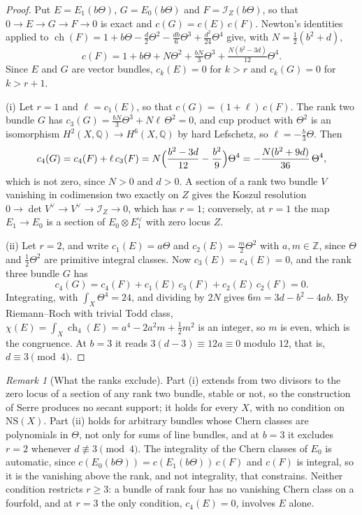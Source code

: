 \documentclass[11pt,reqno]{amsart}
\theoremstyle{plain}
\theoremstyle{definition}
\theoremstyle{remark}
\newtheorem{remark}[theorem]{Remark}
\newcommand{\QQ}{\mathbb{Q}}
\newcommand{\ZZ}{\mathbb{Z}}
\newcommand{\cI}{\mathcal{I}}
\newcommand{\NS}{\mathrm{NS}}
\DeclareMathOperator{\ch}{ch}
\begin{document}
\begin{proof}
Put $E=E_{1}(b\Theta)$, $G=E_{0}(b\Theta)$ and $F=\cI_{Z}(b\Theta)$, so that
$0\to E\to G\to F\to0$ is exact and $c(G)=c(E)\,c(F)$. Newton's identities
applied to $\ch(F)=1+b\Theta-\frac d2\Theta^{2}-\frac{db}{6}\Theta^{3}
+\frac{d^{2}}{24}\Theta^{4}$ give, with $N=\frac12(b^{2}+d)$,
\[
  c(F)=1+b\Theta+N\Theta^{2}+\tfrac{bN}{3}\Theta^{3}
  +\tfrac{N(b^{2}-3d)}{12}\Theta^{4}.
\]
Since $E$ and $G$ are vector bundles, $c_{k}(E)=0$ for $k>r$ and
$c_{k}(G)=0$ for $k>r+1$.

(i) Let $r=1$ and $\ell=c_{1}(E)$, so that $c(G)=(1+\ell)\,c(F)$. The rank
two bundle $G$ has $c_{3}(G)=\frac{bN}{3}\Theta^{3}+N\ell\,\Theta^{2}=0$, and
cup product with $\Theta^{2}$ is an isomorphism $H^{2}(X,\QQ)\to H^{6}(X,\QQ)$
by hard Lefschetz, so $\ell=-\frac b3\Theta$. Then
\[
  c_{4}(G)=c_{4}(F)+\ell\,c_{3}(F)
  =N\Bigl(\frac{b^{2}-3d}{12}-\frac{b^{2}}{9}\Bigr)\Theta^{4}
  =-\frac{N(b^{2}+9d)}{36}\,\Theta^{4},
\]
which is not zero, since $N>0$ and $d>0$. A section of a rank two bundle $V$
vanishing in codimension two exactly on $Z$ gives the Koszul resolution
$0\to\det V^{\vee}\to V^{\vee}\to\cI_{Z}\to0$, which has $r=1$; conversely,
at $r=1$ the map $E_{1}\to E_{0}$ is a section of $E_{0}\otimes E_{1}^{\vee}$
with zero locus $Z$.

(ii) Let $r=2$, and write $c_{1}(E)=a\Theta$ and $c_{2}(E)=\frac m2\Theta^{2}$
with $a,m\in\ZZ$, since $\Theta$ and $\frac12\Theta^{2}$ are primitive
integral classes. Now $c_{3}(E)=c_{4}(E)=0$, and the rank three bundle $G$
has
\[
  c_{4}(G)=c_{4}(F)+c_{1}(E)\,c_{3}(F)+c_{2}(E)\,c_{2}(F)=0 .
\]
Integrating, with $\int_{X}\Theta^{4}=24$, and dividing by $2N$ gives
$6m=3d-b^{2}-4ab$. By Riemann--Roch with trivial Todd class,
$\chi(E)=\int_{X}\ch_{4}(E)=a^{4}-2a^{2}m+\frac12m^{2}$ is an integer, so $m$
is even, which is the congruence. At $b=3$ it reads $3(d-3)\equiv12a\equiv0$
modulo $12$, that is, $d\equiv3\pmod4$.
\end{proof}

\begin{remark}[What the ranks exclude]\label{rem:lowrankburch}
Part (i) extends  from two divisors to the zero locus of a
section of any rank two bundle, stable or not, so the construction of Serre
produces no secant support; it holds for every $X$, with no condition on
$\NS(X)$. Part (ii) holds for arbitrary bundles whose Chern classes are
polynomials in $\Theta$, not only for sums of line bundles, and at $b=3$ it
excludes $r=2$ whenever $d\not\equiv3\pmod4$. The integrality of
the Chern classes of $E_{0}$ is automatic, since
$c(E_{0}(b\Theta))=c(E_{1}(b\Theta))\,c(F)$ and $c(F)$ is integral, so it is
the vanishing above the rank, and not integrality, that constrains. Neither
condition restricts $r\ge3$: a bundle of rank four has no vanishing Chern
class on a fourfold, and at $r=3$ the only condition, $c_{4}(E)=0$, involves
$E$ alone.
\end{remark}
\end{document}
